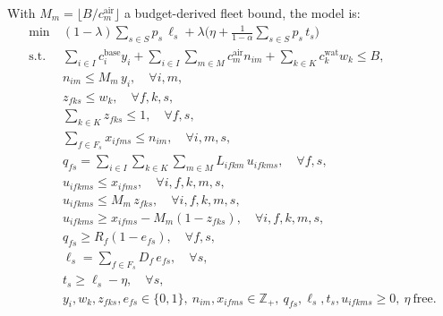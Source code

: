 \documentclass[11pt]{article}
\begin{document}
With $M_m = \lfloor B / c^{\mathrm{air}}_m \rfloor$ a budget-derived
fleet bound, the model is:
\begin{align}
\min\ & (1-\lambda) \sum_{s \in S} p_s\, \ell_s
        + \lambda \Big( \eta + \tfrac{1}{1-\alpha} \sum_{s \in S} p_s\, t_s \Big)
\label{eq:objective} \\
\text{s.t.}\
& \sum_{i \in I} c^{\mathrm{base}}_i y_i
  + \sum_{i \in I}\sum_{m \in M} c^{\mathrm{air}}_m n_{im}
  + \sum_{k \in K} c^{\mathrm{wat}}_k w_k \le B,
\label{eq:budget} \\
& n_{im} \le M_m\, y_i, \quad \forall i, m,
\label{eq:openbase} \\
& z_{fks} \le w_k, \quad \forall f, k, s,
\label{eq:openwater} \\
& \textstyle\sum_{k \in K} z_{fks} \le 1, \quad \forall f, s,
\label{eq:onewater} \\
& \textstyle\sum_{f \in F_s} x_{ifms} \le n_{im}, \quad \forall i, m, s,
\label{eq:fleet} \\
& q_{fs} = \sum_{i \in I}\sum_{k \in K}\sum_{m \in M} L_{ifkm}\, u_{ifkms},
  \quad \forall f, s,
\label{eq:delivered} \\
& u_{ifkms} \le x_{ifms}, \quad \forall i,f,k,m,s,
\label{eq:mc1} \\
& u_{ifkms} \le M_m\, z_{fks}, \quad \forall i,f,k,m,s,
\label{eq:mc2} \\
& u_{ifkms} \ge x_{ifms} - M_m (1 - z_{fks}), \quad \forall i,f,k,m,s,
\label{eq:mc3} \\
& q_{fs} \ge R_f (1 - e_{fs}), \quad \forall f, s,
\label{eq:containment} \\
& \ell_s = \textstyle\sum_{f \in F_s} D_f\, e_{fs}, \quad \forall s,
\label{eq:loss} \\
& t_s \ge \ell_s - \eta, \quad \forall s,
\label{eq:cvar} \\
& y_i, w_k, z_{fks}, e_{fs} \in \{0,1\},\ n_{im}, x_{ifms} \in \mathbb{Z}_{+},\
  q_{fs}, \ell_s, t_s, u_{ifkms} \ge 0,\ \eta \ \text{free}.
\nonumber
\end{align}
\end{document}
